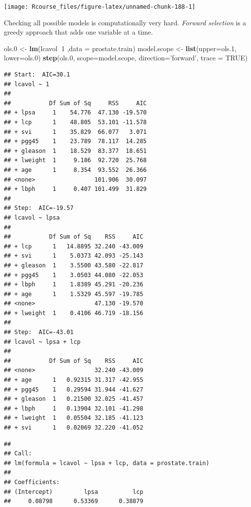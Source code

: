 \documentclass[]{book}
\newenvironment{Shaded}{\begin{snugshade}}{\end{snugshade}}
\newcommand{\KeywordTok}[1]{\textcolor[rgb]{0.13,0.29,0.53}{\textbf{#1}}}
\newcommand{\DataTypeTok}[1]{\textcolor[rgb]{0.13,0.29,0.53}{#1}}
\newcommand{\DecValTok}[1]{\textcolor[rgb]{0.00,0.00,0.81}{#1}}
\newcommand{\StringTok}[1]{\textcolor[rgb]{0.31,0.60,0.02}{#1}}
\newcommand{\OtherTok}[1]{\textcolor[rgb]{0.56,0.35,0.01}{#1}}
\newcommand{\OperatorTok}[1]{\textcolor[rgb]{0.81,0.36,0.00}{\textbf{#1}}}
\newcommand{\NormalTok}[1]{#1}
\theoremstyle{definition}
\theoremstyle{definition}
\theoremstyle{definition}
\theoremstyle{remark}
\begin{document}
\texttt{[image: Rcourse\_files/figure-latex/unnamed-chunk-188-1]}

Checking all possible models is computationally very hard. \emph{Forward
selection} is a greedy approach that adds one variable at a time.

\begin{Shaded}
\begin{Highlighting}[]
\NormalTok{ols.}\DecValTok{0}\NormalTok{ <-}\StringTok{ }\KeywordTok{lm}\NormalTok{(lcavol}\OperatorTok{~}\DecValTok{1}\NormalTok{ ,}\DataTypeTok{data =}\NormalTok{ prostate.train)}
\NormalTok{model.scope <-}\StringTok{ }\KeywordTok{list}\NormalTok{(}\DataTypeTok{upper=}\NormalTok{ols.}\DecValTok{1}\NormalTok{, }\DataTypeTok{lower=}\NormalTok{ols.}\DecValTok{0}\NormalTok{)}
\KeywordTok{step}\NormalTok{(ols.}\DecValTok{0}\NormalTok{, }\DataTypeTok{scope=}\NormalTok{model.scope, }\DataTypeTok{direction=}\StringTok{'forward'}\NormalTok{, }\DataTypeTok{trace =} \OtherTok{TRUE}\NormalTok{)}
\end{Highlighting}
\end{Shaded}

\begin{verbatim}
## Start:  AIC=30.1
## lcavol ~ 1
## 
##           Df Sum of Sq     RSS     AIC
## + lpsa     1    54.776  47.130 -19.570
## + lcp      1    48.805  53.101 -11.578
## + svi      1    35.829  66.077   3.071
## + pgg45    1    23.789  78.117  14.285
## + gleason  1    18.529  83.377  18.651
## + lweight  1     9.186  92.720  25.768
## + age      1     8.354  93.552  26.366
## <none>                 101.906  30.097
## + lbph     1     0.407 101.499  31.829
## 
## Step:  AIC=-19.57
## lcavol ~ lpsa
## 
##           Df Sum of Sq    RSS     AIC
## + lcp      1   14.8895 32.240 -43.009
## + svi      1    5.0373 42.093 -25.143
## + gleason  1    3.5500 43.580 -22.817
## + pgg45    1    3.0503 44.080 -22.053
## + lbph     1    1.8389 45.291 -20.236
## + age      1    1.5329 45.597 -19.785
## <none>                 47.130 -19.570
## + lweight  1    0.4106 46.719 -18.156
## 
## Step:  AIC=-43.01
## lcavol ~ lpsa + lcp
## 
##           Df Sum of Sq    RSS     AIC
## <none>                 32.240 -43.009
## + age      1   0.92315 31.317 -42.955
## + pgg45    1   0.29594 31.944 -41.627
## + gleason  1   0.21500 32.025 -41.457
## + lbph     1   0.13904 32.101 -41.298
## + lweight  1   0.05504 32.185 -41.123
## + svi      1   0.02069 32.220 -41.052
\end{verbatim}

\begin{verbatim}
## 
## Call:
## lm(formula = lcavol ~ lpsa + lcp, data = prostate.train)
## 
## Coefficients:
## (Intercept)         lpsa          lcp  
##     0.08798      0.53369      0.38879
\end{verbatim}
\end{document}
